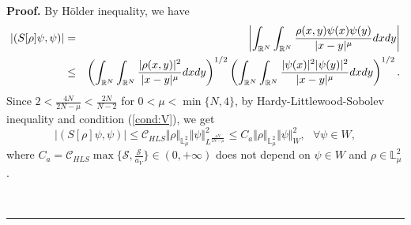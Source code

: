 \documentclass[12pt,thmsa]{article}
\newenvironment{proof}[1][Proof]{\noindent\textbf{#1.} }{\ \rule{0.5em}{0.5em}}
\begin{document}
\begin{proof}
By H\"{o}lder inequality, we have
\begin{eqnarray}
|(S[\rho ]\psi ,\psi )| &=&\left\vert \int_{\mathbb{R}^{N}}\int_{\mathbb{R}%
^{N}}\frac{\rho (x,y)\psi (x)\psi (y)}{|x-y|^{\mu }}dxdy\right\vert  \notag
\\
&\leq &\left( \int_{\mathbb{R}^{N}}\int_{\mathbb{R}^{N}}\frac{|\rho
(x,y)|^{2}}{|x-y|^{\mu }}dxdy\right) ^{1/2}\left( \int_{\mathbb{R}^{N}}\int_{%
\mathbb{R}^{N}}\frac{|\psi (x)|^{2}|\psi (y)|^{2}}{|x-y|^{\mu }}dxdy\right)
^{1/2}.  \label{eq:HLSIneq}
\end{eqnarray}%
Since $2<\frac{4N}{2N-\mu }<\frac{2N}{N-2}$ for $0<\mu <\min \{N,4\}$, by
Hardy-Littlewood-Sobolev inequality and condition (\ref{cond:V}), we get
\begin{equation*}
|(S[\rho ]\psi ,\psi )|\leq \mathcal{C}_{HLS}\Vert \rho \Vert _{\mathbb{L}%
_{\mu }^{2}}\Vert \psi \Vert _{L^{\frac{4N}{2N-\mu }}}^{2}\leq C_{a}\Vert
\rho \Vert _{\mathbb{L}_{\mu }^{2}}\Vert \psi \Vert _{W}^{2},\text{ }\forall
\psi \in W,  \label{eq:HLitEst}
\end{equation*}%
where $C_{a}=\mathcal{C}_{HLS}\max \{\mathcal{S},\frac{\mathcal{S}}{a_{V}}%
\}\in (0,+\infty )$ does not depend on $\psi \in W$ and $\rho \in \mathbb{L}%
_{\mu }^{2}$.


\end{proof}
\end{document}
